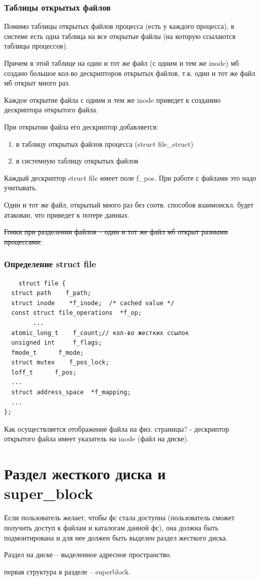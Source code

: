 \subsubsection{Таблицы открытых файлов}

Помимо таблицы открытых файлов процесса (есть у каждого процесса), в системе есть одна таблица на все открытые файлы (на которую ссылаются таблицы процессов).

Причем в этой таблице на один и тот же файл (с одним и тем же inode) мб создано большое кол-во дескрипторов открытых файлов, т.к. один и тот же файл мб открыт много раз. 

Каждое открытие файла с одним и тем же inode приведет к созданию дескриптора открытого файла.

При открытии файла его дескриптор добавляется:
\begin{enumerate}
    \item в таблицу открытых файлов процесса (struct file\_struct)
    \item в системную таблицу открытых файлов
\end{enumerate}

Каждый дескриптор struct file имеет поле f\_pos. При работе с файлами это надо учитывать.

Один и тот же файл, открытый много раз без соотв. способов взаимоискл. будет атакован, что приведет к потере данных.

\sout{Гонки при разделении файлов -- один и тот же файл мб открыт разными \\ процессами.}

\subsubsection{Определение struct file}
\begin{lstlisting}
    struct file {
  struct path    f_path;
  struct inode    *f_inode;  /* cached value */
  const struct file_operations  *f_op;
        ...
  atomic_long_t    f_count;// кол-во жестких ссылок
  unsigned int     f_flags;
  fmode_t      f_mode;
  struct mutex    f_pos_lock;
  loff_t      f_pos;
  ...
  struct address_space  *f_mapping;
  ...
};
\end{lstlisting}
Как осуществляется отображение файла на физ. страницы? - дескриптор открытого файла имеет указатель на inode (файл на диске).

\section{Раздел жесткого диска и super\_block}
\par Если пользователь желает, чтобы фс стала доступна (пользователь сможет получить доступ к файлам и каталогам данной фс), она должна быть подмонтирована и для нее должен быть выделен раздел жесткого диска.
\par Раздел на диске -- выделенное адресное пространство.
\par первая структура в разделе -- superblock.

